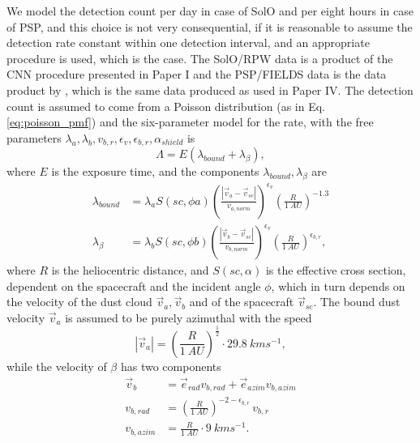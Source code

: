 We model the detection count per day in case of SolO and per eight hours in case of PSP, and this choice is not very consequential, if it is reasonable to assume the detection rate constant within one detection interval, and an appropriate procedure is used, which is the case. The SolO/RPW data is a product of the CNN procedure presented in Paper I and the PSP/FIELDS data is the data product by \citet{malaspina2023dust}, which is the same data produced as used in Paper IV. The detection count is assumed to come from a Poisson distribution (as in Eq. \ref{eq:poisson_pmf}) and the six-parameter model for the rate, with the free parameters $\lambda_a, \lambda_b, v_{b,r}, \epsilon_v, \epsilon_{b,r}, \alpha_{shield}$ is 
\begin{equation}
    \Lambda = E (\lambda_{bound} + \lambda_{\beta}),
\end{equation}
where $E$ is the exposure time, and the components $\lambda_{bound},\lambda_{\beta}$ are
\begin{equation}\begin{split}
    \lambda_{bound} &= \lambda_a  S(sc,\phi{a}) \left( \frac{|\vec{v}_{a} - \vec{v}_{sc}|}{v_{a,norm}}\right)^{\epsilon_v} \left( \frac{R}{\SI{1}{AU}} \right)^{-1.3} \\
    \lambda_{\beta} &= \lambda_b S(sc,\phi{b}) \left( \frac{|\vec{v}_{b} - \vec{v}_{sc}|}{v_{b,norm}}\right)^{\epsilon_v} \left( \frac{R}{\SI{1}{AU}} \right)^{\epsilon_{b,r}},
\end{split}\end{equation}
where $R$ is the heliocentric distance, and $S(sc,\alpha)$ is the effective cross section, dependent on the spacecraft and the incident angle $\phi$, which in turn depends on the velocity of the dust cloud $\vec{v}_a,\vec{v}_b$ and of the spacecraft $\vec{v}_{sc}$. The bound dust velocity $\vec{v}_a$ is assumed to be purely azimuthal with the speed
\begin{equation}
    |\vec{v}_a| = \left( \frac{R}{\SI{1}{AU}} \right)^\frac{1}{2} \cdot \SI{29.8}{kms^{-1}},
\end{equation}
while the velocity of $\beta$ has two components
\begin{equation}\begin{split}
    \vec{v}_b &= \vec{e}_{rad} v_{b,rad} + \vec{e}_{azim} v_{b,azim} \\
    v_{b,rad} &= \left( \frac{R}{\SI{1}{AU}} \right)^{-2-\epsilon_{b,r}} \, v_{b,r} \\
    v_{b,azim} &= \frac{R}{\SI{1}{AU}} \cdot \SI{9}{kms^{-1}}.
\end{split}\end{equation}

